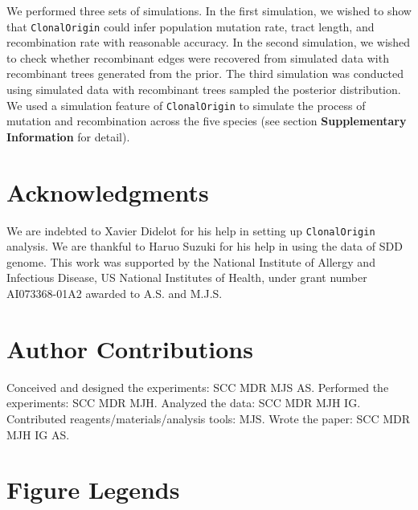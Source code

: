 \documentclass[10pt]{article}
\begin{document}
We performed three sets of simulations.  In the first simulation, we wished to
show that \texttt{ClonalOrigin} could infer population mutation rate, tract
length, and recombination rate with reasonable accuracy. In the second
simulation, we wished to check whether recombinant edges were recovered from
simulated data with recombinant trees generated from the prior. The third
simulation was conducted using simulated data with recombinant trees sampled the
posterior distribution.  We used a simulation feature of \texttt{ClonalOrigin}
to simulate the process of mutation and recombination across the five species
(see section \textbf{Supplementary Information} for detail).


\section*{Acknowledgments}

We are indebted to Xavier Didelot for his help in setting up \texttt{ClonalOrigin}
analysis.  We are thankful to Haruo Suzuki for his help
in using the data of SDD genome. This work was supported by the National
Institute of Allergy and Infectious Disease, US National Institutes
of Health, under grant number AI073368-01A2 awarded to A.S. and M.J.S.

\section*{Author Contributions}

Conceived and designed the experiments: SCC MDR MJS AS.
Performed the experiments: SCC MDR MJH.
Analyzed the data: SCC MDR MJH IG.
Contributed reagents/materials/analysis tools: MJS.
Wrote the paper: SCC MDR MJH IG AS.




\section*{Figure Legends}
\end{document}
